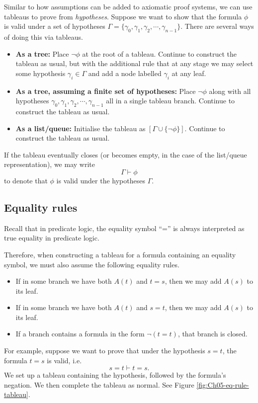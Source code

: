 Similar to how assumptions can be added to axiomatic proof systems, we can use tableaus to prove from \emph{hypotheses}. Suppose we want to show that the formula \(\phi\) is valid under a set of hypotheses \(\Gamma = \{\gamma_0, \gamma_1, \gamma_2, \cdots, \gamma_{n-1}\}\). There are several ways of doing this via tableaus.
%
\begin{itemize}
    \item \textbf{As a tree:} Place \(\neg\phi\) at the root of a tableau. Continue to construct the tableau as usual, but with the additional rule that at any stage we may select some hypothesis \(\gamma_i \in \Gamma\) and add a node labelled \(\gamma_i\) at any leaf.
    \item \textbf{As a tree, assuming a finite set of hypotheses:} Place \(\neg\phi\) along with all hypotheses \(\gamma_0, \gamma_1, \gamma_2, \cdots, \gamma_{n-1}\) all in a single tableau branch. Continue to construct the tableau as usual.
    \item \textbf{As a list/queue:} Initialise the tableau as \([\Gamma\cup\{\neg\phi\}]\). Continue to construct the tableau as usual.
\end{itemize}
%
If the tableau eventually closes (or becomes empty, in the case of the list/queue representation), we may write
%
\[\Gamma\vdash\phi\]
%
to denote that \(\phi\) is valid under the hypotheses \(\Gamma\).



\subsection{Equality rules}

Recall that in predicate logic, the equality symbol ``='' is always interpreted as true equality in predicate logic.

Therefore, when constructing a tableau for a formula containing an equality symbol, we must also assume the following equality rules.
%
\begin{itemize}
    \item If in some branch we have both \(A(t)\) and \(t = s\), then we may add \(A(s)\) to its leaf.
    \item If in some branch we have both \(A(t)\) and \(s = t\), then we may add \(A(s)\) to its leaf.
    \item If a branch contains a formula in the form \(\neg(t = t)\), that branch is closed.
\end{itemize}
%
For example, suppose we want to prove that under the hypothesis \(s = t\), the formula \(t = s\) is valid, i.e.
%
\[s = t \vdash t = s\text{.}\]
%
We set up a tableau containing the hypothesis, followed by the formula's negation. We then complete the tableau as normal. See Figure \ref{fig:Ch05-eq-rule-tableau}.

